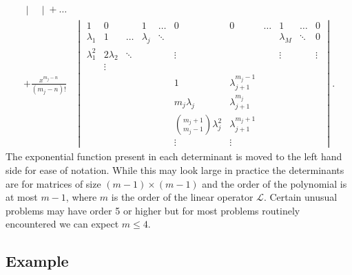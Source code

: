\documentclass{book}
\begin{document}
\begin{align*}
\begin{vmatrix}
\end{vmatrix} + \dots \\
+ \frac{x^{m_j - n}}{(m_j - n)!} &
\begin{vmatrix}
1           & 0           &       & 1         & \dots & 0 & 0 & \dots & 1         & \dots & 0 \\
\lambda_1   & 1           & \dots & \lambda_j &\ddots &   &   &       & \lambda_M &\ddots & 0 \\
\lambda_1^2 & 2 \lambda_2 &\ddots &           &       &\vdots & &     & \vdots    &       & \vdots \\
            & \vdots      &       &           &       &   &   &       &           &       & \\
            &             &       &           &       & 1 & \lambda_{j+1}^{m_j-1} &       &           &       & \\
            &             &       &       & & m_j \lambda_j & \lambda_{j+1}^{m_j} &       & &       & \\
            &        & & & & \binom{m_j+1}{m_j-1} \lambda_j^2 & \lambda_{j+1}^{m_j+1} &       &           & & \\
            &             &       &           &       &\vdots &\vdots &           &       &
\end{vmatrix} .
\end{align*}
The exponential function present in each determinant is moved to the left hand side for ease of notation.
While this may look large in practice the determinants are for matrices of size $(m-1) \times (m-1)$ and the order of the polynomial is at most $m-1$, where $m$ is the order of the linear operator $\mathcal{L}$.
Certain unusual problems may have order 5 or higher but for most problems routinely encountered we can expect $m \leq 4$.

\subsection{Example}
\end{document}
